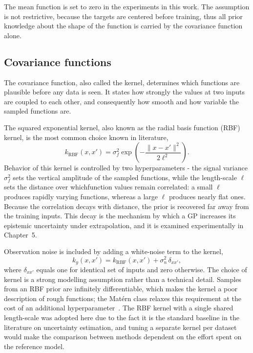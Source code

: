The mean function is set to zero in the experiments in this work. The assumption is not
restrictive, because the targets are centered before training, thus all prior knowledge about the
shape of the function is carried by the covariance function alone.

\subsection{Covariance functions}
\label{subsec:gp-kernel}

The covariance function, also called the kernel, determines which functions are plausible
before any data is seen. It states how strongly the values at two inputs are coupled to each other, and consequently how smooth and how variable the sampled functions are. 

The squared exponential kernel, also known as the radial basis function (RBF) kernel, is the most common choice known in literature,
%
\begin{equation}
    k_{\mathrm{RBF}}(x, x')
    = \sigma_f^2 \exp\!\left(
        -\frac{\lVert x - x' \rVert^2}{2\ell^2}
      \right) .
    \label{eq:rbf-kernel}
\end{equation}
%
Behavior of this kernel is controlled by two hyperparameters - the signal variance $\sigma_f^2$ sets the vertical amplitude of the sampled functions, while the length-scale $\ell$ sets the distance over whichfunction values remain correlated: a small $\ell$ produces rapidly varying functions, whereas a large $\ell$ produces nearly flat ones. Because the correlation decays with distance, the prior is recovered far away from the training inputs. This decay is the mechanism by which a GP increases its epistemic uncertainty under extrapolation, and it is examined experimentally in Chapter~5.

Observation noise is included by adding a white-noise term to the kernel,
%
\begin{equation}
    k_y(x, x') = k_{\mathrm{RBF}}(x, x') + \sigma_n^2\, \delta_{xx'},
    \label{eq:noisy-kernel}
\end{equation}
%
where $\delta_{xx'}$ equals one for identical set of inputs and zero otherwise. The choice of kernel is a strong modelling assumption rather than a technical detail. Samples from an RBF prior are infinitely differentiable, which makes the kernel a poor description of rough functions; the
Mat\'ern class relaxes this requirement at the cost of an additional hyperparameter~\cite{rasmussen2006}. The RBF kernel with a single shared length-scale was
adopted here due to the fact it is the standard baseline in the literature on uncertainty estimation, and tuning a separate kernel per dataset would make the comparison between methods
dependent on the effort spent on the reference model.

